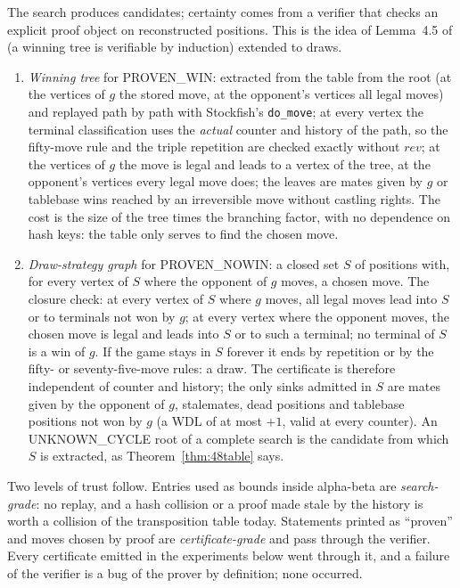 \documentclass{article}
\theoremstyle{plain}
\theoremstyle{definition}
\theoremstyle{remark}
\newcommand{\PW}{\textsf{PROVEN\_WIN}}
\newcommand{\PN}{\textsf{PROVEN\_NOWIN}}
\newcommand{\UC}{\textsf{UNKNOWN\_CYCLE}}
\newcommand{\code}[1]{\texttt{#1}}
\begin{document}
The search produces candidates; certainty comes from a verifier that checks an explicit proof object on reconstructed positions. This is the idea of Lemma~4.5 of \cite{romano2026} (a winning tree is verifiable by induction) extended to draws.
\begin{enumerate}[leftmargin=*]
\item \emph{Winning tree} for \PW{}: extracted from the table from the root (at the vertices of $g$ the stored move, at the opponent's vertices all legal moves) and replayed path by path with Stockfish's \code{do\_move}; at every vertex the terminal classification uses the \emph{actual} counter and history of the path, so the fifty-move rule and the triple repetition are checked exactly without $\mathit{rev}$; at the vertices of $g$ the move is legal and leads to a vertex of the tree, at the opponent's vertices every legal move does; the leaves are mates given by $g$ or tablebase wins reached by an irreversible move without castling rights. The cost is the size of the tree times the branching factor, with no dependence on hash keys: the table only serves to find the chosen move.
\item \emph{Draw-strategy graph} for \PN{}: a closed set $S$ of positions with, for every vertex of $S$ where the opponent of $g$ moves, a chosen move. The closure check: at every vertex of $S$ where $g$ moves, all legal moves lead into $S$ or to terminals not won by $g$; at every vertex where the opponent moves, the chosen move is legal and leads into $S$ or to such a terminal; no terminal of $S$ is a win of $g$. If the game stays in $S$ forever it ends by repetition or by the fifty- or seventy-five-move rules: a draw. The certificate is therefore independent of counter and history; the only sinks admitted in $S$ are mates given by the opponent of $g$, stalemates, dead positions and tablebase positions not won by $g$ (a WDL of at most $+1$, valid at every counter). An \UC{} root of a complete search is the candidate from which $S$ is extracted, as Theorem~\ref{thm:48table} says.
\end{enumerate}
Two levels of trust follow. Entries used as bounds inside alpha-beta are \emph{search-grade}: no replay, and a hash collision or a proof made stale by the history is worth a collision of the transposition table today. Statements printed as ``proven'' and moves chosen by proof are \emph{certificate-grade} and pass through the verifier. Every certificate emitted in the experiments below went through it, and a failure of the verifier is a bug of the prover by definition; none occurred.
\end{document}
